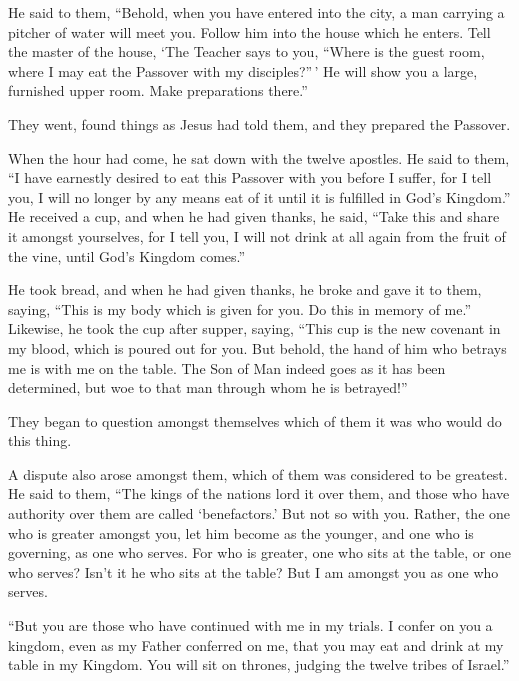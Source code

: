  He said to them, ``Behold, when you have entered into
the city, a man carrying a pitcher of water will meet you. Follow him
into the house which he enters.  Tell the master of the
house, `The Teacher says to you, ``Where is the guest room, where I may
eat the Passover with my disciples?''\,'  He will show
you a large, furnished upper room. Make preparations there.''

 They went, found things as Jesus had told them, and they
prepared the Passover.

 When the hour had come, he sat down with the twelve
apostles.  He said to them, ``I have earnestly desired to
eat this Passover with you before I suffer,  for I tell
you, I will no longer by any means eat of it until it is fulfilled in
God's Kingdom.''  He received a cup, and when he had
given thanks, he said, ``Take this and share it amongst yourselves,
 for I tell you, I will not drink at all again from the
fruit of the vine, until God's Kingdom comes.''

 He took bread, and when he had given thanks, he broke
and gave it to them, saying, ``This is my body which is given for you.
Do this in memory of me.''  Likewise, he took the cup
after supper, saying, ``This cup is the new covenant in my blood, which
is poured out for you.  But behold, the hand of him who
betrays me is with me on the table.  The Son of Man
indeed goes as it has been determined, but woe to that man through whom
he is betrayed!''

 They began to question amongst themselves which of them
it was who would do this thing.

 A dispute also arose amongst them, which of them was
considered to be greatest.  He said to them, ``The kings
of the nations lord it over them, and those who have authority over them
are called `benefactors.'  But not so with you. Rather,
the one who is greater amongst you, let him become as the younger, and
one who is governing, as one who serves.  For who is
greater, one who sits at the table, or one who serves? Isn't it he who
sits at the table? But I am amongst you as one who serves.

 ``But you are those who have continued with me in my
trials.  I confer on you a kingdom, even as my Father
conferred on me,  that you may eat and drink at my table
in my Kingdom. You will sit on thrones, judging the twelve tribes of
Israel.''

